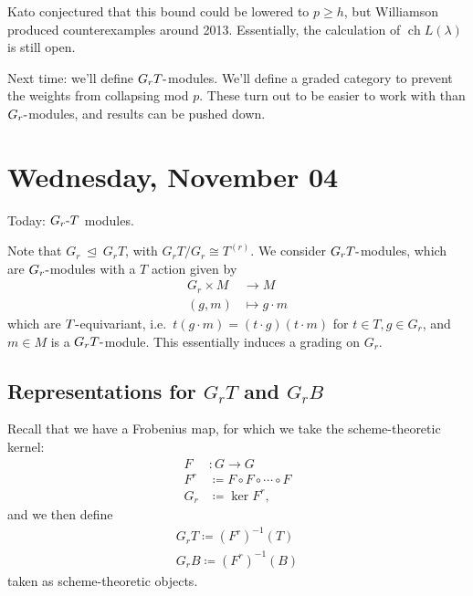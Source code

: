 \begin{remark}

Kato conjectured that this bound could be lowered to \(p\geq h\), but
Williamson produced counterexamples around 2013. Essentially, the
calculation of \(\operatorname{ch}L(\lambda)\) is still open.

\end{remark}

Next time: we'll define \(G_rT{\hbox{-}}\)modules. We'll define a graded
category to prevent the weights from collapsing mod \(p\). These turn
out to be easier to work with than \(G_r{\hbox{-}}\)modules, and results
can be pushed down.

\hypertarget{wednesday-november-04}{%
\section{Wednesday, November 04}\label{wednesday-november-04}}

Today: \(G_r{\hbox{-}}T\) modules.

Note that \(G_r{~\trianglelefteq~}G_r T\), with
\(G_r T/G_r \cong T^{(r)}\). We consider \(G_r T{\hbox{-}}\)modules,
which are \(G_r{\hbox{-}}\)modules with a \(T\) action given by
\begin{align*}  
G_r \times M &\to M \\
(g, m) &\mapsto g\cdot m
\end{align*}
which are \(T{\hbox{-}}\)equivariant,
i.e.~\(t(g\cdot m) = (t\cdot g)(t\cdot m)\) for \(t\in T, g\in G_r\),
and \(m\in M\) is a \(G_r T{\hbox{-}}\)module. This essentially induces
a grading on \(G_r\).

\hypertarget{representations-for-g_r-t-and-g_r-b}{%
\subsection{\texorpdfstring{Representations for \(G_r T\) and
\(G_r B\)}{Representations for G\_r T and G\_r B}}\label{representations-for-g_r-t-and-g_r-b}}

Recall that we have a Frobenius map, for which we take the
scheme-theoretic kernel:
\begin{align*}  
F&: G \to G \\ 
F^r &\coloneqq F\circ F \circ \cdots \circ F \\
G_r &\coloneqq\ker F^r
,\end{align*}
and we then define
\begin{align*}  
G_r T \coloneqq(F^r)^{-1} (T) \\
G_r B \coloneqq(F^r)^{-1} (B) 
\end{align*}
taken as scheme-theoretic objects.

